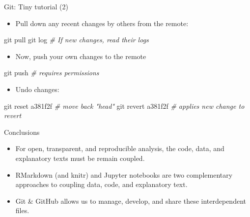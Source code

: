 \documentclass[10pt,ignorenonframetext,]{beamer}
\newenvironment{Shaded}{\begin{snugshade}}{\end{snugshade}}
\newcommand{\CommentTok}[1]{\textcolor[rgb]{0.56,0.35,0.01}{\textit{#1}}}
\newcommand{\FunctionTok}[1]{\textcolor[rgb]{0.00,0.00,0.00}{#1}}
\newcommand{\NormalTok}[1]{#1}
\providecommand{\tightlist}{%
  \setlength{\itemsep}{0pt}\setlength{\parskip}{0pt}}
\begin{document}
\begin{frame}[fragile]{Git: Tiny tutorial (2)}
\protect\hypertarget{git-tiny-tutorial-2}{}

\begin{itemize}
\tightlist
\item
  Pull down any recent changes by others from the remote:
\end{itemize}

\begin{Shaded}
\begin{Highlighting}[]
      \FunctionTok{git}\NormalTok{ pull}
      \FunctionTok{git}\NormalTok{ log }\CommentTok{# If new changes, read their logs}
\end{Highlighting}
\end{Shaded}

\begin{itemize}
\tightlist
\item
  Now, push your own changes to the remote
\end{itemize}

\begin{Shaded}
\begin{Highlighting}[]
      \FunctionTok{git}\NormalTok{ push }\CommentTok{# requires permissions}
\end{Highlighting}
\end{Shaded}

\begin{itemize}
\tightlist
\item
  Undo changes:
\end{itemize}

\begin{Shaded}
\begin{Highlighting}[]
      \FunctionTok{git}\NormalTok{ reset a381f2f }\CommentTok{# move back "head"}
      \FunctionTok{git}\NormalTok{ revert a381f2f }\CommentTok{# applies new change to revert }
\end{Highlighting}
\end{Shaded}

\end{frame}

\begin{frame}{Conclusions}
\protect\hypertarget{conclusions}{}

\begin{itemize}
\tightlist
\item
  For open, transparent, and reproducible analysis, the code, data, and
  explanatory texts must be remain coupled.
\item
  RMarkdown (and knitr) and Jupyter notebooks are two complementary
  approaches to coupling data, code, and explanatory text.
\item
  Git \& GitHub allows us to manage, develop, and share these
  interdependent files.
\end{itemize}

\end{frame}
\end{document}
